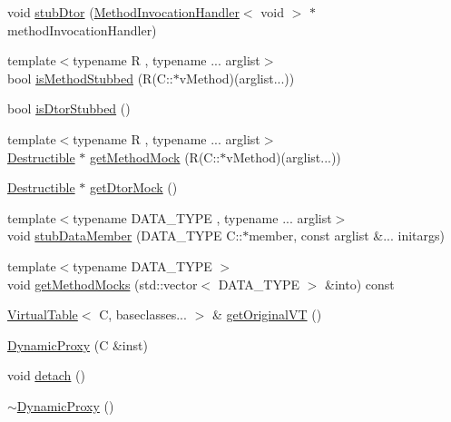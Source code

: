 \begin{DoxyCompactItemize}
\item 
void \mbox{\hyperlink{structfakeit_1_1DynamicProxy_a8ab5aa831398c6ee27cbdb12ee1f15cf}{stub\+Dtor}} (\mbox{\hyperlink{structfakeit_1_1MethodInvocationHandler}{Method\+Invocation\+Handler}}$<$ void $>$ $\ast$method\+Invocation\+Handler)
\item 
{\footnotesize template$<$typename R , typename ... arglist$>$ }\\bool \mbox{\hyperlink{structfakeit_1_1DynamicProxy_aeccdd2a03ebbf8eecc3291ebe6ccbfc4}{is\+Method\+Stubbed}} (R(C\+::$\ast$v\+Method)(arglist...))
\item 
bool \mbox{\hyperlink{structfakeit_1_1DynamicProxy_a6d3f0dfa93dc98b37fb50002bc4ea2bc}{is\+Dtor\+Stubbed}} ()
\item 
{\footnotesize template$<$typename R , typename ... arglist$>$ }\\\mbox{\hyperlink{classfakeit_1_1Destructible}{Destructible}} $\ast$ \mbox{\hyperlink{structfakeit_1_1DynamicProxy_a9774578f92b4d0258c72192dd16d6d0e}{get\+Method\+Mock}} (R(C\+::$\ast$v\+Method)(arglist...))
\item 
\mbox{\hyperlink{classfakeit_1_1Destructible}{Destructible}} $\ast$ \mbox{\hyperlink{structfakeit_1_1DynamicProxy_a32f8a09734ef6d70162d682fd593707b}{get\+Dtor\+Mock}} ()
\item 
{\footnotesize template$<$typename D\+A\+T\+A\+\_\+\+T\+Y\+PE , typename ... arglist$>$ }\\void \mbox{\hyperlink{structfakeit_1_1DynamicProxy_a872480e95dba48c6e690fb7cdc017f9d}{stub\+Data\+Member}} (D\+A\+T\+A\+\_\+\+T\+Y\+PE C\+::$\ast$member, const arglist \&... initargs)
\item 
{\footnotesize template$<$typename D\+A\+T\+A\+\_\+\+T\+Y\+PE $>$ }\\void \mbox{\hyperlink{structfakeit_1_1DynamicProxy_a21e8fdd6bcf64b2d7e0b86261529da35}{get\+Method\+Mocks}} (std\+::vector$<$ D\+A\+T\+A\+\_\+\+T\+Y\+PE $>$ \&into) const
\item 
\mbox{\hyperlink{structfakeit_1_1VirtualTable}{Virtual\+Table}}$<$ C, baseclasses... $>$ \& \mbox{\hyperlink{structfakeit_1_1DynamicProxy_aa34a496518156007196fd405dbf2e058}{get\+Original\+VT}} ()
\item 
\mbox{\hyperlink{structfakeit_1_1DynamicProxy_a417e0221b7df3845b201a9e4a1f5028b}{Dynamic\+Proxy}} (C \&inst)
\item 
void \mbox{\hyperlink{structfakeit_1_1DynamicProxy_a154f25eeeb36c0635d9209dd5870943e}{detach}} ()
\item 
\mbox{\hyperlink{structfakeit_1_1DynamicProxy_a05e9d9c1bcaf4bcd14d1b6311e16c809}{$\sim$\+Dynamic\+Proxy}} ()

\end{DoxyCompactItemize}
